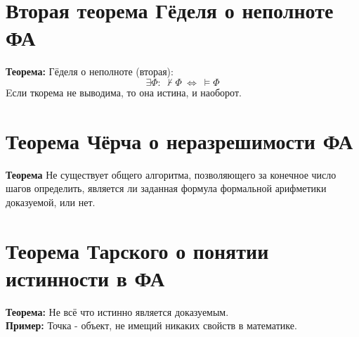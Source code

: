 \documentclass[../main.tex]{subfiles}
\begin{document}

\section{Вторая теорема Гёделя о неполноте ФА }
\textbf{Теорема:
} Гёделя о неполноте (вторая): \[\exists \varPhi: \ \nvdash \varPhi \ \Leftrightarrow \ \vDash \varPhi\]
Eсли ткорема не выводима, то она истина, и наоборот. \\


\section{Теорема Чёрча о неразрешимости ФА}
\textbf{Теорема
} Не существует общего алгоритма, позволяющего за конечное число шагов определить, является ли заданная формула формальной арифметики доказуемой, или нет.

\section{Теорема Тарского о понятии истинности в ФА}
\textbf{Теорема:
} Не всё что истинно является доказуемым. \\
\textbf{Пример:
} Точка - объект, не имещий никаких свойств в математике.
\end{document}
